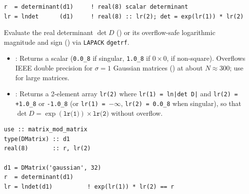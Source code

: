 \lstset{language=[95]Fortran}
\begin{lstlisting}
r  = determinant(d1)     ! real(8) scalar determinant
lr = lndet      (d1)     ! real(8) :: lr(2); det = exp(lr(1)) * lr(2)
\end{lstlisting}

Evaluate the real determinant $\det D$ () or its overflow-safe logarithmic magnitude and sign () via \texttt{LAPACK} \texttt{dgetrf}.

\begin{itemize}
  \item {}: Returns a  scalar (\texttt{0.0\_8} if singular, \texttt{1.0\_8} if $0\times 0$,  if non-square). Overflows IEEE double precision for $\sigma = 1$ Gaussian matrices () at about $N \approx 300$; use  for large matrices.
  \item {}: Returns a 2-element  array \texttt{lr(2)} where \texttt{lr(1) = ln|det D|} and \texttt{lr(2) = +1.0\_8} or \texttt{-1.0\_8} (or \texttt{lr(1) = }$-\infty$, \texttt{lr(2) = 0.0\_8} when singular), so that $\det D = \exp(\texttt{lr(1)}) \times \texttt{lr(2)}$ without overflow.
\end{itemize}

\begin{description}[leftmargin=2.2cm, style=nextline]
\end{description}

\lstset{language=[95]Fortran}
\begin{lstlisting}
use :: matrix_mod_matrix
type(DMatrix) :: d1
real(8)       :: r, lr(2)

d1 = DMatrix('gaussian', 32)
r  = determinant(d1)
lr = lndet(d1)          ! exp(lr(1)) * lr(2) == r
\end{lstlisting}


